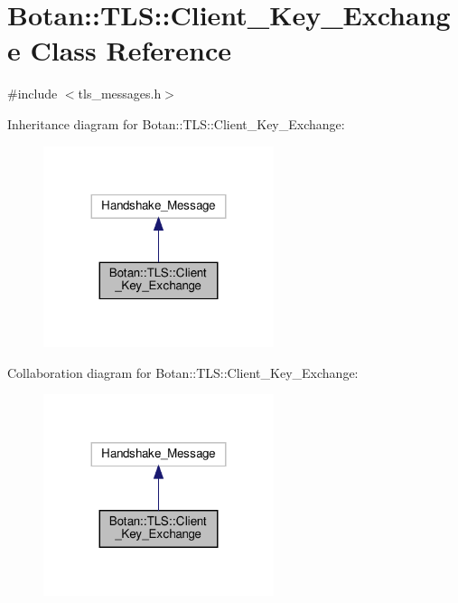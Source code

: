 \hypertarget{class_botan_1_1_t_l_s_1_1_client___key___exchange}{}\section{Botan\+:\+:T\+LS\+:\+:Client\+\_\+\+Key\+\_\+\+Exchange Class Reference}
\label{class_botan_1_1_t_l_s_1_1_client___key___exchange}


{\ttfamily \#include $<$tls\+\_\+messages.\+h$>$}



Inheritance diagram for Botan\+:\+:T\+LS\+:\+:Client\+\_\+\+Key\+\_\+\+Exchange\+:
\nopagebreak
\begin{figure}[H]
\begin{center}
\leavevmode
\includegraphics[width=191pt]{class_botan_1_1_t_l_s_1_1_client___key___exchange__inherit__graph}
\end{center}
\end{figure}


Collaboration diagram for Botan\+:\+:T\+LS\+:\+:Client\+\_\+\+Key\+\_\+\+Exchange\+:
\nopagebreak
\begin{figure}[H]
\begin{center}
\leavevmode
\includegraphics[width=191pt]{class_botan_1_1_t_l_s_1_1_client___key___exchange__coll__graph}
\end{center}
\end{figure}
